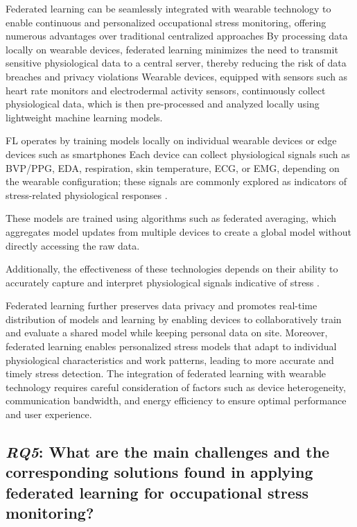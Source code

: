 \documentclass[12pt]{article}
\begin{document}
Federated learning can be seamlessly integrated with wearable technology to enable continuous and personalized occupational stress monitoring, offering numerous advantages over traditional centralized approaches By processing data locally on wearable devices, federated learning minimizes the need to transmit sensitive physiological data to a central server, thereby reducing the risk of data breaches and privacy violations \cite{jessica_chia_liu_cd0e0973} Wearable devices, equipped with sensors such as heart rate monitors and electrodermal activity sensors, continuously collect physiological data, which is then pre-processed and analyzed locally using lightweight machine learning models.

FL operates by training models locally on individual wearable devices or edge devices such as smartphones Each device can collect physiological signals such as BVP/PPG, EDA, respiration, skin temperature, ECG, or EMG, depending on the wearable configuration; these signals are commonly explored as indicators of stress-related physiological responses \cite{abdulrahman_alahmadi_32bc288c}.

These models are trained using algorithms such as federated averaging, which aggregates model updates from multiple devices to create a global model without directly accessing the raw data.  

Additionally, the effectiveness of these technologies depends on their ability to accurately capture and interpret physiological signals indicative of stress \cite{ahmad_almadhor_8cc2e670}.

Federated learning further preserves data privacy and promotes real-time distribution of models and learning by enabling devices to collaboratively train and evaluate a shared model while keeping personal data on site. Moreover, federated learning enables personalized stress models that adapt to individual physiological characteristics and work patterns, leading to more accurate and timely stress detection. The integration of federated learning with wearable technology requires careful consideration of factors such as device heterogeneity, communication bandwidth, and energy efficiency to ensure optimal performance and user experience.

\subsection{\textit{RQ5}: What are the main challenges and the corresponding solutions found in applying federated learning for occupational stress monitoring?}
\end{document}
